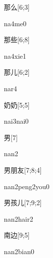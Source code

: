 \begin{verbete}[na4me0]{那么}[6;3]
\begin{pronuncia}{na4me0}
\end{pronuncia}
\end{verbete}

\begin{verbete}[na4xie1]{那些}[6;8]
\begin{pronuncia}{na4xie1}
\end{pronuncia}
\end{verbete}

\begin{verbete}[nar4]{那儿}[6;2]
\begin{pronuncia}{nar4}
\end{pronuncia}
\end{verbete}

\begin{verbete}{奶奶}[5;5]
\begin{pronuncia}{nai3nai0}
\end{pronuncia}
\end{verbete}

\begin{verbete}[nan2]{男}[7]
\begin{pronuncia}{nan2}
\end{pronuncia}
\end{verbete}

\begin{verbete}{男朋友}[7;8;4]
\begin{pronuncia}{nan2peng2you0}
\end{pronuncia}
\end{verbete}

\begin{verbete}{男孩儿}[7;9;2]
\begin{pronuncia}{nan2hair2}
\end{pronuncia}
\end{verbete}

\begin{verbete}{南边}[9;5]
\begin{pronuncia}{nan2bian0}
\end{pronuncia}
\end{verbete}

